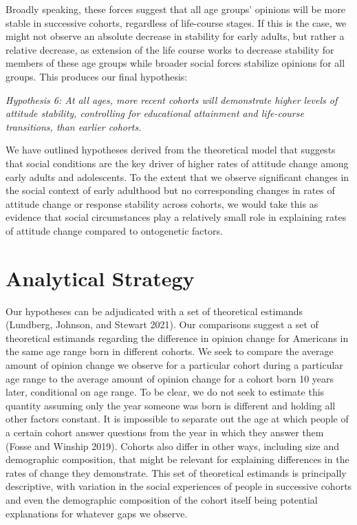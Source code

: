 \documentclass[
  12pt,
]{article}
\begin{document}
Broadly speaking, these forces suggest that all age groups' opinions will be more stable in successive cohorts, regardless of life-course stages. If this is the case, we might not observe an absolute decrease in stability for early adults, but rather a relative decrease, as extension of the life course works to decrease stability for members of these age groups while broader social forces stabilize opinions for all groups. This produces our final hypothesis:

\emph{Hypothesis 6: At all ages, more recent cohorts will demonstrate higher levels of attitude stability, controlling for educational attainment and life-course transitions, than earlier cohorts.}

We have outlined hypotheses derived from the theoretical model that suggests that social conditions are the key driver of higher rates of attitude change among early adults and adolescents. To the extent that we observe significant changes in the social context of early adulthood but no corresponding changes in rates of attitude change or response stability across cohorts, we would take this as evidence that social circumstances play a relatively small role in explaining rates of attitude change compared to ontogenetic factors.

\hypertarget{analytical-strategy}{%
\section{Analytical Strategy}\label{analytical-strategy}}

Our hypotheses can be adjudicated with a set of theoretical estimands (Lundberg, Johnson, and Stewart 2021). Our comparisons suggest a set of theoretical estimands regarding the difference in opinion change for Americans in the same age range born in different cohorts. We seek to compare the average amount of opinion change we observe for a particular cohort during a particular age range to the average amount of opinion change for a cohort born 10 years later, conditional on age range. To be clear, we do not seek to estimate this quantity assuming only the year someone was born is different and holding all other factors constant. It is impossible to separate out the age at which people of a certain cohort answer questions from the year in which they answer them (Fosse and Winship 2019). Cohorts also differ in other ways, including size and demographic composition, that might be relevant for explaining differences in the rates of change they demonstrate. This set of theoretical estimands is principally descriptive, with variation in the social experiences of people in successive cohorts and even the demographic composition of the cohort itself being potential explanations for whatever gaps we observe.
\end{document}
